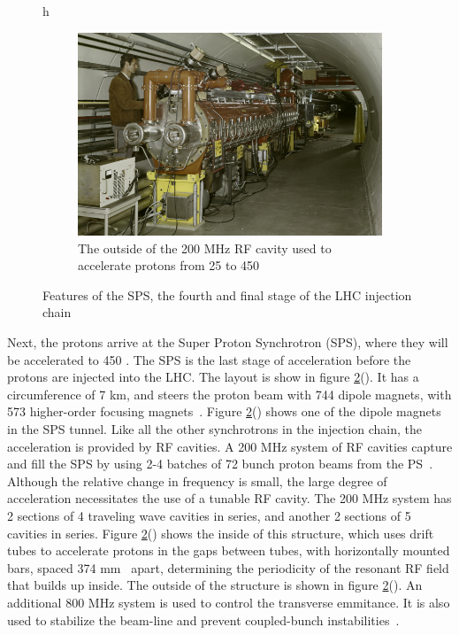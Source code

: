 \begin{figure}{h}
\begin{subfigure}[h]{0.45\textwidth}
        \includegraphics[width=\textwidth]{Figures/LHC_Diagrams/LHC__SPS__RFCavity_OutsideView.jpg}
        \caption{The outside of the 200 MHz RF cavity used to
          accelerate protons from 25 to 450 \GeV \cite{LHC:LHC_sps_rf_outside_image}}\label{fig:sps_rf_outside}
      \end{subfigure}
       \caption{Features of the SPS, the fourth and final stage of
        the LHC injection chain}\label{fig:sps}
\end{figure}

\par Next, the protons arrive at the Super Proton Synchrotron (SPS), where
they will be accelerated to 450 \GeV.  The SPS is the last stage of acceleration
before the protons are injected into the LHC.  The layout is show in
figure \ref{fig:sps}().  It has a circumference
of 7 km, and steers the proton beam with 744 dipole magnets, with 573
higher-order focusing magnets~\cite{LHC:LHC_sps_cern_website}.  Figure
\ref{fig:sps}() shows one of the dipole
magnets in the SPS tunnel.  Like all the other synchrotrons in the
injection chain, the acceleration is provided by RF cavities.  A 200
MHz system of RF cavities capture and fill the SPS by using 2-4
batches of 72 bunch proton beams from the
PS~\cite{LHC:TDR_Vol3_InjectionChain_Benedikt}.  Although the relative
change in frequency is small, the large degree of acceleration
necessitates the use of a tunable RF cavity.  The 200 MHz system has 2
sections of 4 traveling wave cavities in series, and another 2
sections of 5 cavities in series.  Figure
\ref{fig:sps}() shows the inside of this
structure, which uses drift tubes to accelerate protons in the gaps
between tubes, with horizontally mounted bars, spaced 374
mm~\cite{LHC:LHC_SPS_200MHzRF_Dôme} apart, determining the periodicity
of the resonant RF field that builds up inside.  The outside of the
structure is shown in figure
\ref{fig:sps}().  An additional 800 MHz
system is used to control the transverse emmitance.  It is also used
to stabilize the beam-line and prevent coupled-bunch
instabilities~\cite{LHC:TDR_Vol3_InjectionChain_Benedikt}.  

